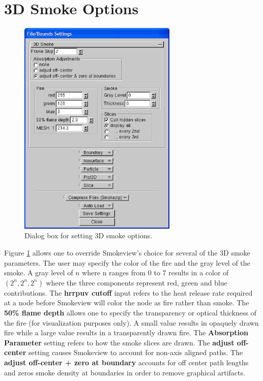 \documentclass[11pt,twoside]{book}
\newcommand{\figoptions}{hbp}
\begin{document}
\section{3D Smoke Options}
\begin{figure}[\figoptions]
\centerline{\includegraphics[width=2.9722in]{figures/fig3DSmoke} }
\caption[Dialog Box for setting 3D smoke options] {Dialog box for
setting 3D smoke options.   } \label{fig3DSmoke}
\end{figure}
Figure \ref{fig3DSmoke} allows one to override Smokeview's choice
for several of the 3D smoke parameters.  The user may specify the
color of the fire and the gray level of the smoke.  A gray level
of $n$ where n ranges from 0 to 7 results in a color of
$(2^n,2^n,2^n)$ where the three components represent red, green
and blue contributions.  The {\bf hrrpuv cutoff} input refers to
the heat release rate required at a node before Smokeview will
color the node as fire rather than smoke.  The {\bf 50\% flame
depth} allows one to specify the transparency or optical thickness
of the fire (for visualization purposes only). A small value
results in opaquely drawn fire while a large value results in a
transparently drawn fire. The {\bf Absorption Parameter} setting
refers to how the smoke slices are drawn.  The {\bf adjust
off-center} setting causes Smokeview to account for non-axis
aligned paths. The {\bf adjust off-center + zero at boundary}
accounts for off center path lengths and zeros smoke density at
boundaries in order to remove graphical artifacts.
\end{document}
